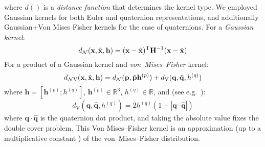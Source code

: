 \noindent where $d()$ is a \textit{distance function} that determines the kernel type. We employed Gaussian kernels for both Euler and quaternion representations, and additionally Gaussian+Von Mises Fisher kernels for the case of quaternions. For a \textit{Gaussian kernel}:
\begin{equation}
d_\mathrm{\mathcal{N}}(\mathbf{x}, \hat{\mathbf{x}}, \mathbf{h}) =
(\mathbf{x} - \hat{\mathbf{x}})^\mathrm{T}\mathbf{H}^{-1}(\mathbf{x} - \hat{\mathbf{x}})
\label{eq:Density.Estimation.gaussiandist}
\end{equation}
For a product of a Gaussian kernel and \textit{von~Mises--Fisher} kernel:
\begin{equation}
d_\mathrm{\mathcal{N}V}(\mathbf{x}, \hat{\mathbf{x}}, \mathbf{h}) =
d_\mathrm{\mathcal{N}}(\mathbf{p}, \hat{\mathbf{p}} \mathbf{h}^{(p)})  + d_\mathrm{V}(\mathbf{q}, \hat{\mathbf{q}}, h^{(q)})
\label{eq:Density.Estimation.gaussvmfdist}
\end{equation}
\noindent where %
$\mathbf{h} = \left[ \mathbf{h}^{(p)} ; h^{(q)} \right]$,
$\mathbf{h}^{(p)} \in \mathbb{R}^3$,
$h^{(q)} \in \mathbb{R}$,
and (see e.g.\ \citep{abramowitz_handbook_1965}):
\begin{equation}
d_\mathrm{V}(\mathbf{q}, \hat{\mathbf{q}}, h^{(q)}) =
2 h^{(q)} \left(1 - \left| \mathbf{q} \cdot \hat{\mathbf{q}} \right|\right)
\label{eq:Density.Estimation.vmfdist}
\end{equation}
\noindent where $\mathbf{q} \cdot \hat{\mathbf{q}}$ is the quaternion dot product, and taking the absolute value fixes the double cover problem. This Von Mises--Fisher kernel is an approximation (up to a multiplicative constant \citep{detry_learning_2010}) of the von~Mises--Fisher distribution.

